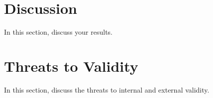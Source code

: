 \section{Discussion}\label{sec:discussion}

In this section, discuss your results.

\section{Threats to Validity}\label{sec:threats}

In this section, discuss the threats to internal and external validity.
